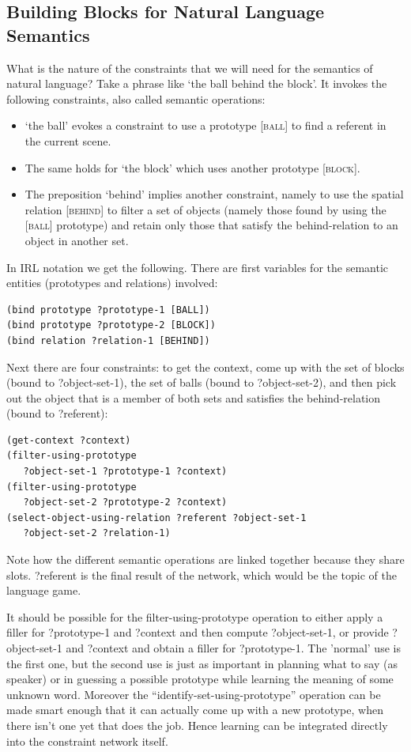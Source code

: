 \subsection{Building Blocks for Natural Language Semantics}

What is the nature of the constraints that we will need for the semantics of natural language? 
Take a phrase like `the ball behind the block'. It invokes the following constraints, also called 
semantic operations: 
\begin{itemize}
\item `the ball' evokes a constraint to use a prototype [\textsc{ball}] to find a referent in the current scene.
\item The same holds for `the block' which uses another prototype [\textsc{block}]. 
\item The preposition `behind' implies another constraint, namely to use the spatial relation [\textsc{behind}] to filter a 
set of objects (namely those found by using the [\textsc{ball}] prototype) and retain only those that satisfy the behind-relation 
to an object in another set. 
\end{itemize} 

In IRL notation we get the following. There are first variables for the semantic entities (prototypes and relations) 
involved:
\begin{verbatim}
(bind prototype ?prototype-1 [BALL])
(bind prototype ?prototype-2 [BLOCK])
(bind relation ?relation-1 [BEHIND])
\end{verbatim}
Next there are four constraints: to get the context, come up with the set of blocks
(bound to ?object-set-1), the set of balls (bound to ?object-set-2), and then pick out the object 
that is a member of both sets and satisfies the behind-relation (bound to ?referent): 
\begin{verbatim}
(get-context ?context)
(filter-using-prototype 
   ?object-set-1 ?prototype-1 ?context)
(filter-using-prototype 
   ?object-set-2 ?prototype-2 ?context)
(select-object-using-relation ?referent ?object-set-1
   ?object-set-2 ?relation-1)
\end{verbatim}
Note how the different semantic operations are linked together because they share slots.
?referent is the final result of the network, which would be the topic of the language game. 

It should be possible for the filter-using-prototype operation
to either apply a filler for ?prototype-1 and 
?context and then compute ?object-set-1, or provide ?object-set-1 and ?context and obtain a filler for ?prototype-1. 
The 'normal' use is the first one, but the second use is just as important in planning what to
say (as speaker) or in guessing a possible prototype while learning the meaning of some unknown word. 
Moreover the ``identify-set-using-prototype'' operation can be made smart enough that it can actually come up with
a new prototype, when there isn't one yet that does the job. Hence learning can be 
integrated directly into the constraint network itself. 

